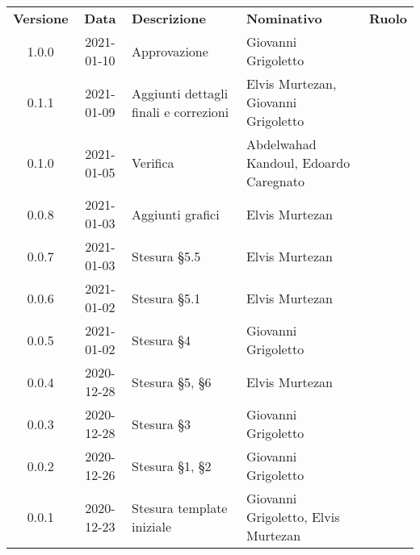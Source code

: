 {
    \renewcommand{\arraystretch}{1.5}
    \centering
    \begin{longtable}{ c c  C{3.5cm}  C{3.5cm}  c }
        \rowcolor{\primaryColor}
        \textcolor{\secondaryColor}{
        \textbf{Versione}}     & \textcolor{\secondaryColor}{\textbf{Data}}       & \textcolor{\secondaryColor}
        {\textbf{Descrizione}} & \textcolor{\secondaryColor}{\textbf{Nominativo}} & \textcolor{\secondaryColor}{\textbf{Ruolo}}                          \\


        1.0.0  & 
        2021-01-10  & 
        Approvazione & 
        Giovanni Grigoletto & 
        \responsabile{} \\

        0.1.1  & 
        2021-01-09 & 
        Aggiunti dettagli finali e correzioni & 
        Elvis Murtezan, Giovanni Grigoletto  & 
        \responsabile{} \\

        0.1.0  & 
        2021-01-05 & 
        Verifica & 
        Abdelwahad Kandoul, Edoardo Caregnato  & 
        \verificatore{} \\

        0.0.8  & 
        2021-01-03 & 
        Aggiunti grafici & 
        Elvis Murtezan  & 
        \responsabile{} \\

        0.0.7  & 
        2021-01-03 & 
        Stesura §5.5 &
        Elvis Murtezan  & 
        \responsabile{} \\

        0.0.6  & 
        2021-01-02 & 
        Stesura §5.1 & 
        Elvis Murtezan  & 
        \responsabile{} \\

        0.0.5  & 
        2021-01-02 & 
        Stesura §4 & 
        Giovanni Grigoletto & 
        \responsabile{} \\

        0.0.4  & 
        2020-12-28 & 
        Stesura §5, §6 & 
        Elvis Murtezan  & 
        \responsabile{} \\

        0.0.3  & 
        2020-12-28 & 
        Stesura §3 & 
        Giovanni Grigoletto & 
        \responsabile{} \\
        
        0.0.2  & 
        2020-12-26 & 
        Stesura §1, §2 & 
        Giovanni Grigoletto & 
        \responsabile{} \\

        0.0.1  & 
        2020-12-23 & 
        Stesura template iniziale & 
        Giovanni Grigoletto, Elvis Murtezan & 
        \responsabile{} \\
    \end{longtable}
}